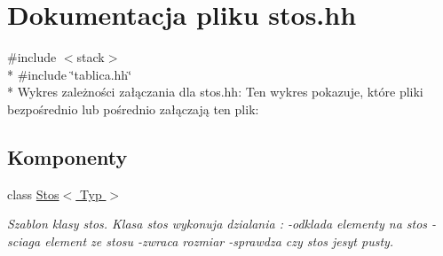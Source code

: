 \hypertarget{stos_8hh}{\section{Dokumentacja pliku stos.\-hh}
\label{stos_8hh}
}
{\ttfamily \#include $<$stack$>$}\\*
{\ttfamily \#include \char`\"{}tablica.\-hh\char`\"{}}\\*
Wykres zależności załączania dla stos.\-hh\-:
Ten wykres pokazuje, które pliki bezpośrednio lub pośrednio załączają ten plik\-:
\subsection*{Komponenty}
\begin{DoxyCompactItemize}
\item 
class \hyperlink{class_stos}{Stos$<$ Typ $>$}
\begin{DoxyCompactList}\small\item\em Szablon klasy stos. Klasa stos wykonuja dzialania \-: -\/odklada elementy na stos -\/sciaga element ze stosu -\/zwraca rozmiar -\/sprawdza czy stos jesyt pusty. \end{DoxyCompactList}\end{DoxyCompactItemize}
